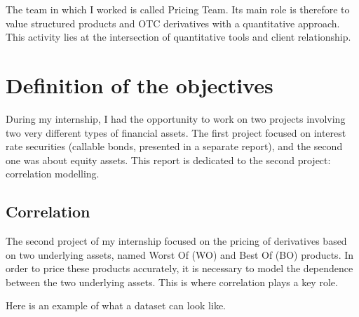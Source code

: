 \documentclass{article}
\begin{document}
The team in which I worked is called Pricing Team. Its main role is therefore to value structured products and OTC derivatives with a quantitative approach. This activity lies at the intersection of quantitative tools and client relationship.



\section{Definition of the objectives}

During my internship, I had the opportunity to work on two projects involving two very different types of financial assets. The first project focused on interest rate securities (callable bonds, presented in a separate report), and the second one was about equity assets. This report is dedicated to the second project: correlation modelling.

\subsection{Correlation}

The second project of my internship focused on the pricing of derivatives based on two underlying assets, named Worst Of (WO) and Best Of (BO) products. In order to price these products accurately, it is necessary to model the dependence between the two underlying assets. This is where correlation plays a key role.

Here is an example of what a dataset can look like.
\end{document}
